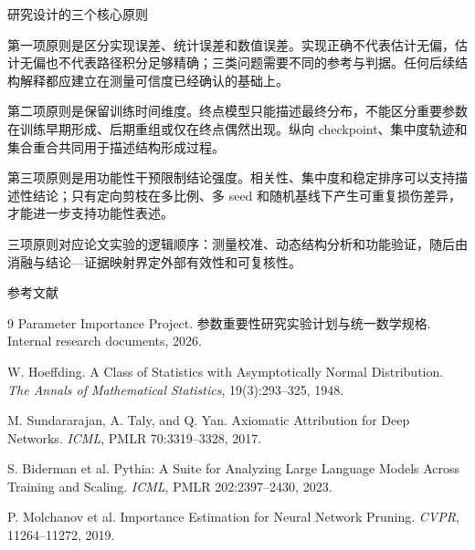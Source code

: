 \documentclass[aspectratio=169,10pt]{beamer}
\begin{document}
\begin{frame}{研究设计的三个核心原则}
{    第一项原则是区分实现误差、统计误差和数值误差。实现正确不代表估计无偏，估计无偏也不代表路径积分足够精确；三类问题需要不同的参考与判据。任何后续结构解释都应建立在测量可信度已经确认的基础上。\par
    第二项原则是保留训练时间维度。终点模型只能描述最终分布，不能区分重要参数在训练早期形成、后期重组或仅在终点偶然出现。纵向 checkpoint、集中度轨迹和集合重合共同用于描述结构形成过程。\par
    第三项原则是用功能性干预限制结论强度。相关性、集中度和稳定排序可以支持描述性结论；只有定向剪枝在多比例、多 seed 和随机基线下产生可重复损伤差异，才能进一步支持功能性表述。\par
    三项原则对应论文实验的逻辑顺序：测量校准、动态结构分析和功能验证，随后由消融与结论—证据映射界定外部有效性和可复核性。
  }
\end{frame}

\begin{frame}{参考文献}
  \begin{thebibliography}{9}
    \small
      Parameter Importance Project.
      \newblock 参数重要性研究实验计划与统一数学规格.
      \newblock Internal research documents, 2026.

      W. Hoeffding.
      \newblock A Class of Statistics with Asymptotically Normal Distribution.
      \newblock \emph{The Annals of Mathematical Statistics}, 19(3):293--325, 1948.

      M. Sundararajan, A. Taly, and Q. Yan.
      \newblock Axiomatic Attribution for Deep Networks.
      \newblock \emph{ICML}, PMLR 70:3319--3328, 2017.

      S. Biderman et al.
      \newblock Pythia: A Suite for Analyzing Large Language Models Across Training and Scaling.
      \newblock \emph{ICML}, PMLR 202:2397--2430, 2023.

      P. Molchanov et al.
      \newblock Importance Estimation for Neural Network Pruning.
      \newblock \emph{CVPR}, 11264--11272, 2019.
  \end{thebibliography}
\end{frame}
\end{document}
